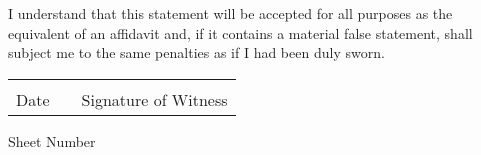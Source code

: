 \documentclass[12pt]{article}
\begin{document}
I understand that this statement will be accepted for all purposes  as
  the  equivalent  of  an  affidavit  and, if it contains a material false
  statement, shall subject me to the same penalties as if I had been  duly
  sworn.

\vspace{0.125in}

\begin{center}
\noindent\begin{tabular}{ccc}
\underline{\hspace{0.30\textwidth}} & \hspace{0.30\textwidth} & \underline{\hspace{0.30\textwidth}}\\ 
Date & & Signature of Witness
\end{tabular}

\vspace{0.25in}

Sheet Number \underline{\hspace{1in}}
\end{center}
\end{document}

